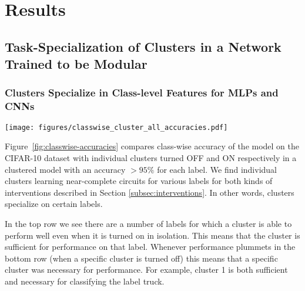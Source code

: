 
\section{Results}
\label{sec:results}

\subsection{Task-Specialization of Clusters in a Network Trained to be Modular}\label{sec:cluster-specialization}

\subsubsection{Clusters Specialize in Class-level Features for MLPs and CNNs }

\begin{figure*}[t]
    \centering
    \texttt{[image: figures/classwise\_cluster\_all\_accuracies.pdf]}
    \caption{Class-wise accuracy for each label with clusters turned ON (top) and OFF (bottom). Note that individual clusters learn near-complete circuits for various labels, such as Cluster $0$ for \textit{SHIP} and Cluster $1$ for \textit{TRUCK}. The figure on the top shows that a cluster is ``sufficient'' to predict a given class, while a dip in the accuracy in figure on the bottom shows that it is ``necessary''. For instance, note that Cluster $3$ is both necessary and sufficient for completely identifying a ``deer''.}
    \label{fig:classwise-accuracies}
\end{figure*}

Figure~\ref{fig:classwise-accuracies} compares class-wise accuracy of the model on the CIFAR-10 dataset with individual clusters turned OFF and ON respectively in a clustered model with an accuracy $>95\%$ for each label. 
We find individual clusters learning near-complete circuits for various labels for both kinds of interventions described in Section \ref{subsec:interventions}. 
In other words, clusters specialize on certain labels.

In the top row we see there are a number of labels for which a cluster is able to perform well even when it is turned on in isolation. This means that the cluster is sufficient for performance on that label. 
Whenever performance plummets in the bottom row (when a specific cluster is turned off) this means that a specific cluster was necessary for performance.
For example, cluster 1 is both sufficient and necessary for classifying the label truck.


